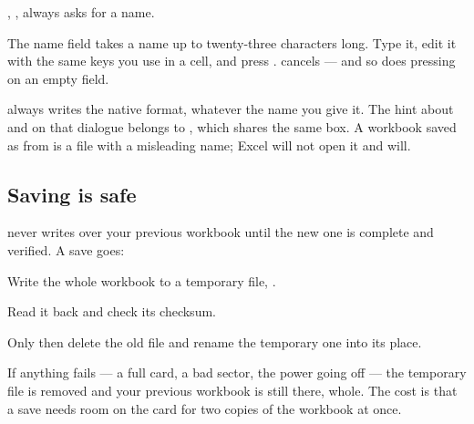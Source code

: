 , , always asks for a name.

\begin{ccfigure}
\caption{Typing a name for a workbook}
\label{fig:nameprompt}
\end{ccfigure}

The name field takes a name up to twenty-three characters long. Type it, edit it
with the same keys you use in a cell, and press . 
cancels --- and so does pressing  on an empty field.

\begin{ccnote}
 always writes the native  format, whatever the name
you give it. The hint about  and  on that dialogue
belongs to , which shares the same box. A workbook saved as
 from  is a  file with a
misleading name; Excel will not open it and \ccprod{} will.
\end{ccnote}

\subsection{Saving is safe}

\ccprod{} never writes over your previous workbook until the new one is
complete and verified. A save goes:

\begin{ccprocedure}
\item Write the whole workbook to a temporary file, .
\item Read it back and check its checksum.
\item Only then delete the old file and rename the temporary one into its
place.
\end{ccprocedure}

If anything fails --- a full card, a bad sector, the power going off --- the
temporary file is removed and your previous workbook is still there, whole. The
cost is that a save needs room on the card for two copies of the workbook at
once.

